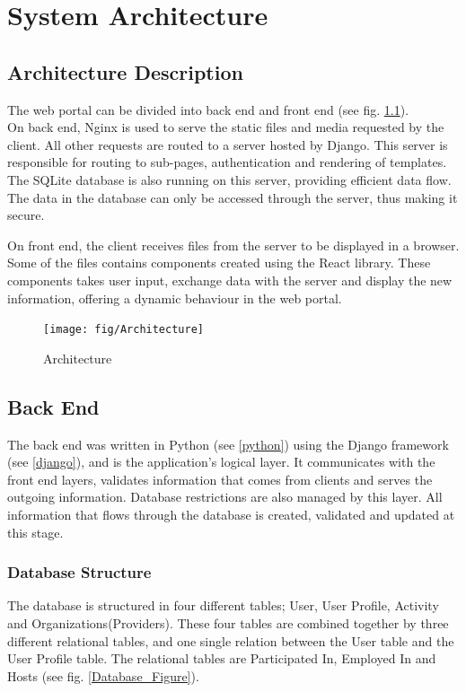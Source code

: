 
\chapter{System Architecture}

\section{Architecture Description}
The web portal can be divided into back end and front end (see fig. \ref{Architecture}).
\\On back end, Nginx is used to serve the static files and media requested by the client. All other requests are routed to a server hosted by Django. This server is responsible for routing to sub-pages, authentication and rendering of templates. The SQLite database is also running on this server, providing efficient data flow. The data in the database can only be accessed through the server, thus making it secure.

On front end, the client receives files from the server to be displayed in a browser. Some of the files contains components created using the React library. These components takes user input, exchange data with the server and display the new information, offering a dynamic behaviour in the web portal.

\begin{figure}[ht]
\centering
    \texttt{[image: fig/Architecture]}
\caption{Architecture}
\label{Architecture}
\end{figure}

\section{Back End}
The back end was written in Python (see \ref{python}) using the Django framework (see \ref{django}), and is the application's logical layer. It communicates with the front end layers, validates information that comes from clients and serves the outgoing information. Database restrictions are also managed by this layer. All information that flows through the database is created, validated and updated at this stage. 


\subsection{Database Structure}
The database is structured in four different tables; User, User Profile, Activity and Organizations(Providers). These four tables are combined together by three different relational tables, and one single relation between the User table and the User Profile table. The relational tables are Participated In, Employed In and Hosts (see fig. \ref{Database_Figure}).

